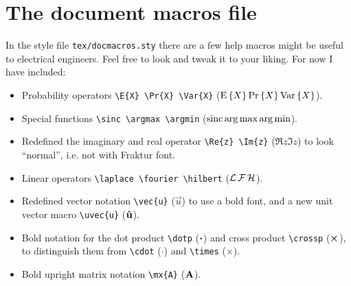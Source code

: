 \section{The document macros file}

In the style file \texttt{tex/docmacros.sty} there are a few help macros might
be useful to electrical engineers. Feel free to look and tweak it to your
liking. For now I have included:
\begin{itemize}
  \item Probability operators
    \lstinline!\E{X} \Pr{X} \Var{X}! (\(\operatorname{E} \left\{X\right\} \operatorname{Pr} \left\{X\right\} \operatorname{Var} \left\{X\right\}\)).

  \item Special functions
    \lstinline!\sinc \argmax \argmin! (\(\operatorname{sinc} \operatorname*{arg\,max} \operatorname*{arg\,min}\)).

  \item Redefined the imaginary and real operator \lstinline!\Re{z} \Im{z}!
    (\(\Re{z} \Im{z}\)) to look ``normal'', i.e. not with Fraktur font.

  \item Linear operators \lstinline!\laplace \fourier \hilbert!
    (\(\operatorname{\mathcal{L}} \operatorname{\mathcal{F}} \operatorname{\mathcal{H}}\)).

  \item Redefined vector notation \lstinline!\vec{u}! (\(\vec{u}\)) to use a
    bold font, and a new unit vector macro \lstinline!\uvec{u}!
    (\(\mathbf{\bm{\hat{u}}}\)).

  \item Bold notation for the dot product \lstinline!\dotp! (\(\boldsymbol\cdot\)) and
    cross product \lstinline!\crossp! (\(\boldsymbol\times\)), to distinguish them from
    \lstinline!\cdot! (\(\cdot\)) and \lstinline!\times! (\(\times\)).

  \item Bold upright matrix notation \lstinline!\mx{A}! (\(\bm{\mathrm{A}}\)).
\end{itemize}
